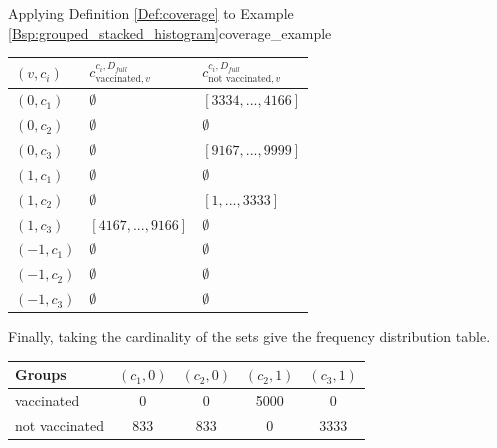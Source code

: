 \begin{Bsp}{Applying Definition \ref{Def:coverage} to Example \ref{Bsp:grouped_stacked_histogram}}{coverage_example}
\captionsetup{type=htypei}
\begin{minipage}[t]{\linewidth}
    \vspace{1ex}
    \centering
    \begin{tabular}{l|ll}
        \toprule
        $(v,c_i)$ & $c_{\text{vaccinated},v}^{c_i,D_{full}}$ & $c_{\text{not vaccinated},v}^{c_i,D_{full}}$\\
        \midrule
        \midrule
        $(0,c_1)$ & $\emptyset$ & $[3334,...,4166]$ \\
        $(0,c_2)$ & $\emptyset$ & $\emptyset$\\
        $(0,c_3)$ & $\emptyset$ & $[9167,...,9999]$\\
        $(1,c_1)$ & $\emptyset$ & $\emptyset$\\
        $(1,c_2)$ & $\emptyset$ & $[1,...,3333]$\\
        $(1,c_3)$ & $[4167,...,9166]$ & $\emptyset$\\
        $(-1,c_1)$ & $\emptyset$ & $\emptyset$ \\
        $(-1,c_2)$ & $\emptyset$ & $\emptyset$ \\
        $(-1,c_3)$ & $\emptyset$ & $\emptyset$ \\
        \bottomrule
    \end{tabular}
    \label{fig:coverage_frequency_distribution_entries_all_constraints}
    \vspace{1ex}
\end{minipage}

Finally, taking the cardinality of the sets give the frequency distribution table.
   \captionsetup{type=htypei}
   \begin{minipage}[t]{\linewidth}
        \vspace{1ex}
        \centering
        \begin{tabular}{l|cccc}
            \toprule
             Groups & $(c_1,0)$ & $(c_2,0)$ & $(c_2,1)$ & $(c_3,1)$ \\
             \midrule
             vaccinated & 0 & 0 & 5000 & 0 \\
             not vaccinated & 833 & 833 & 0 & 3333\\
             \bottomrule
        \end{tabular}
        \label{fig:frequency_distribution_table_coverage}
        \vspace{1ex}
    \end{minipage}


\end{Bsp}
